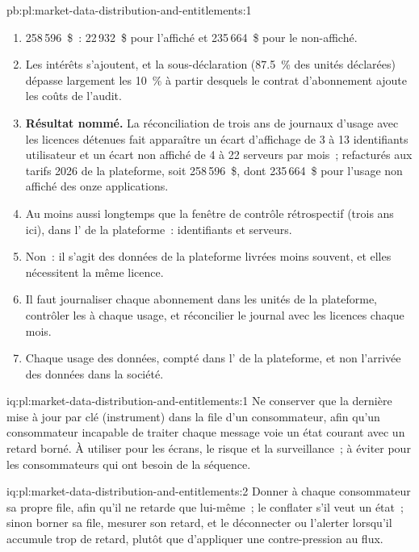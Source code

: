 \begin{solution}{pb:pl:market-data-distribution-and-entitlements:1}
\begin{enumerate}
\item 258\,596~\$~: 22\,932~\$ pour l'affiché et 235\,664~\$ pour le non-affiché.
\item Les intérêts s'ajoutent, et la sous-déclaration (87.5~\% des unités déclarées) dépasse largement
les 10~\% à partir desquels le contrat d'abonnement ajoute les coûts de l'audit.
\item \textbf{Résultat nommé.} La réconciliation de trois ans de journaux d'usage avec les licences détenues fait apparaître un écart d'affichage de 3 à 13
identifiants utilisateur et un écart non affiché de 4 à 22 serveurs par mois~; refacturés aux tarifs 2026 de la plateforme, soit 258\,596~\$, dont 235\,664~\$ pour
l'usage non affiché des onze applications.
\item Au moins aussi longtemps que la fenêtre de contrôle rétrospectif (trois ans ici), dans l' de la plateforme~: identifiants et serveurs.
\item Non~: il s'agit des données de la plateforme livrées moins souvent, et elles nécessitent la même licence.
\item Il faut journaliser chaque abonnement dans les unités de la plateforme, contrôler les  à chaque usage, et réconcilier le journal avec les licences chaque mois.
\item Chaque usage des données, compté dans l' de la plateforme, et non l'arrivée des données dans la société.
\end{enumerate}
\end{solution}

\begin{solution}{iq:pl:market-data-distribution-and-entitlements:1}
Ne conserver que la dernière mise à jour par clé (instrument) dans la file d'un consommateur, afin qu'un consommateur incapable de traiter chaque message voie
un état courant avec un retard borné. À utiliser pour les écrans, le risque et la surveillance~; à éviter pour les consommateurs qui ont besoin de la séquence.
\end{solution}

\begin{solution}{iq:pl:market-data-distribution-and-entitlements:2}
Donner à chaque consommateur sa propre file, afin qu'il ne retarde que lui-même~; le conflater s'il veut un état~; sinon borner sa file, mesurer son retard, et
le déconnecter ou l'alerter lorsqu'il accumule trop de retard, plutôt que d'appliquer une contre-pression au flux.
\end{solution}

